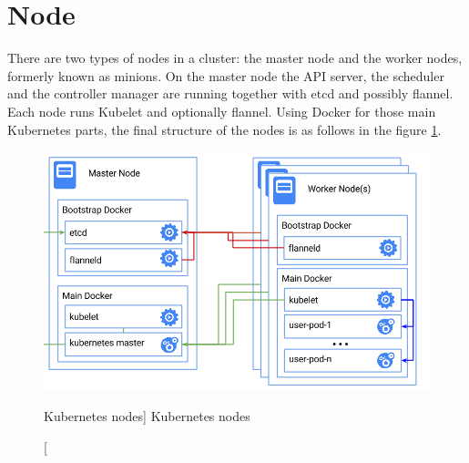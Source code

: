 \section{Node}
There are two types of nodes in a cluster: the master node and the worker nodes, formerly known as minions. On the master node the API server, the scheduler and the controller manager are running together with etcd and possibly flannel. Each node runs Kubelet and optionally flannel. Using Docker for those main Kubernetes parts, the final structure of the nodes is as follows in the figure \ref{fig:kubernetes-docker-nodes}.

\begin{figure}[htb]\centering
  \includegraphics[width=1\textwidth]{images/k8s-docker-nodes.png}
  \caption
    [Kubernetes nodes]
    {Kubernetes nodes \cite{kubernetes-docker-multinode}}
  \label{fig:kubernetes-docker-nodes}
\end{figure}

               